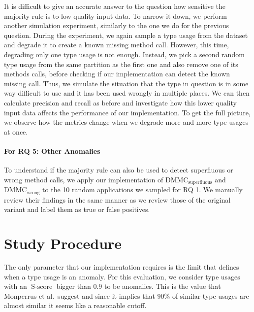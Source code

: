 It is difficult to give an accurate answer to the question how sensitive the majority rule is to low-quality input data.
To narrow it down, we perform another simulation experiment, similarly to the one we do for the previous question.
During the experiment, we again sample a type usage from the dataset and degrade it to create a known missing method call.
However, this time, degrading only one type usage is not enough.
Instead, we pick a second random type usage from the same partition as the first one and also remove one of its methods calls, before checking if our implementation can detect the known missing call.
Thus, we simulate the situation that the type in question is in some way difficult to use and it has been used wrongly in multiple places.
We can then calculate precision and recall as before and investigate how this lower quality input data affects the performance of our implementation.
To get the full picture, we observe how the metrics change when we degrade more and more type usages at once.


\paragraph{For RQ 5: Other Anomalies}

To understand if the majority rule can also be used to detect superfluous or wrong method calls, we apply our implementation of $\text{DMMC}_\text{superfluous}$ and $\text{DMMC}_\text{wrong}$ to the 10 random applications we sampled for RQ 1.
We manually review their findings in the same manner as we review those of the original variant and label them as true or false positives.

\section{Study Procedure}

The only parameter that our implementation requires is the limit that defines when a type usage is an anomaly.
For this evaluation, we consider type usages with an $\operatorname{S-score}$ bigger than $0.9$ to be anomalies.
This is the value that Monperrus et al.\ suggest and since it implies that 90\% of similar type usages are almost similar it seems like a reasonable cutoff.

